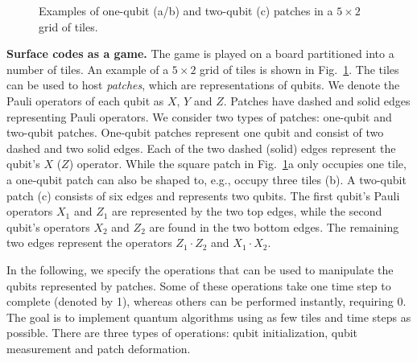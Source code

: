 \documentclass[prx,aps,letterpaper,twocolumn,allowfontchageintitle=true,accepted=2019-02-01]{quantumarticle}
\begin{document}
\begin{figure}[b!]
\centering
\def\svgwidth{\linewidth}

\caption{Examples of one-qubit (a/b) and two-qubit (c) patches in a $5\times 2$ grid of tiles.}
\label{fig:patches}
\end{figure}


\textbf{Surface codes as a game.}
The game is played on a board partitioned into a number of tiles. An example of a $5 \times 2$ grid of tiles is shown in Fig.~\ref{fig:patches}. The tiles can be used to host \textit{patches}, which are representations of qubits. We denote the Pauli operators of each qubit as $X$, $Y$ and $Z$. Patches have dashed and solid edges representing Pauli operators. We consider two types of patches: one-qubit and two-qubit patches. One-qubit patches represent one qubit and consist of two dashed and two solid edges. Each of the two dashed (solid) edges represent the qubit's $X$ ($Z$) operator. While the square patch in Fig.~\ref{fig:patches}a only occupies one tile, a one-qubit patch can also be shaped to, e.g., occupy three tiles (b). A two-qubit patch (c) consists of six edges and represents two qubits. The first qubit's Pauli operators $X_1$ and $Z_1$ are represented by the two top edges, while the second qubit's operators $X_2$ and $Z_2$ are found in the two bottom edges. The remaining two edges represent the operators $Z_1 \cdot Z_2$ and $X_1 \cdot X_2$.

 In the following, we specify the operations that can be used to manipulate the qubits represented by patches. Some of these operations take one time step to complete (denoted by 1\clock), whereas others can be performed instantly, requiring 0\clock. The goal is to implement quantum algorithms using as few tiles and time steps as possible.
There are three types of operations: qubit initialization, qubit measurement and patch deformation.
\end{document}
